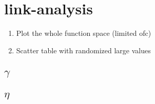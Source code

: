 
\section{link-analysis}\label{sec:graphs:link-analysis}

\begin{enumerate}
    \item Plot the whole function space (limited ofc)
    \item Scatter table with randomized large values
\end{enumerate}

\subsection{$\gamma$}

\subsection{$\eta$}
